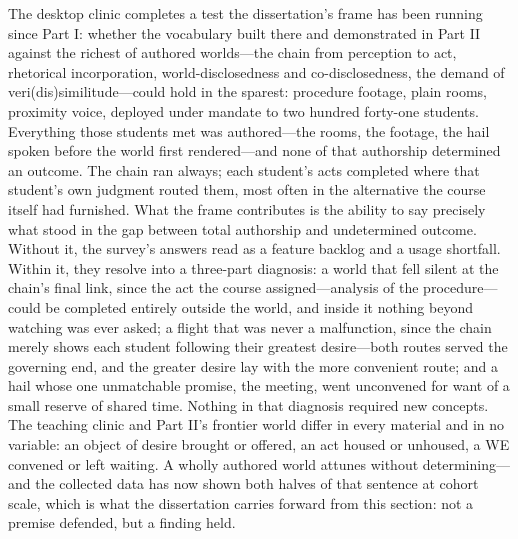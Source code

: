 
The desktop clinic completes a test the dissertation's frame has been
running since Part I: whether the vocabulary built there and
demonstrated in Part II against the richest of authored worlds---the chain from
perception to act, rhetorical incorporation, world-disclosedness and
co-disclosedness, the demand of veri(dis)similitude---could hold in
the sparest: procedure footage, plain rooms, proximity voice, deployed
under mandate to two hundred forty-one students. Everything those
students met was authored---the rooms, the footage, the hail spoken
before the world first rendered---and none of that authorship
determined an outcome. The chain ran always; each student's acts
completed where that student's own judgment routed them, most often in
the alternative the course itself had furnished. What the frame
contributes is the ability to say precisely what stood in the gap
between total authorship and undetermined outcome. Without it, the
survey's answers read as a feature backlog and a usage shortfall.
Within it, they resolve into a three-part diagnosis: a world that fell
silent at the chain's final link, since the act the course
assigned---analysis of the procedure---could be completed entirely
outside the world, and inside it nothing beyond watching was ever
asked; a flight that was never a malfunction, since the chain merely
shows each student following their greatest desire---both routes
served the governing end, and the greater desire lay with the more
convenient route; and a hail whose one unmatchable promise, the
meeting, went unconvened for want of a small reserve of shared time. Nothing in that diagnosis required
new concepts. The teaching clinic and Part II's frontier world differ
in every material and in no variable: an object of desire brought or
offered, an act housed or unhoused, a WE convened or left waiting. A
wholly authored world attunes without determining---and the collected
data has now shown both halves of that sentence at cohort scale, which
is what the dissertation carries forward from this section: not a
premise defended, but a finding held.
